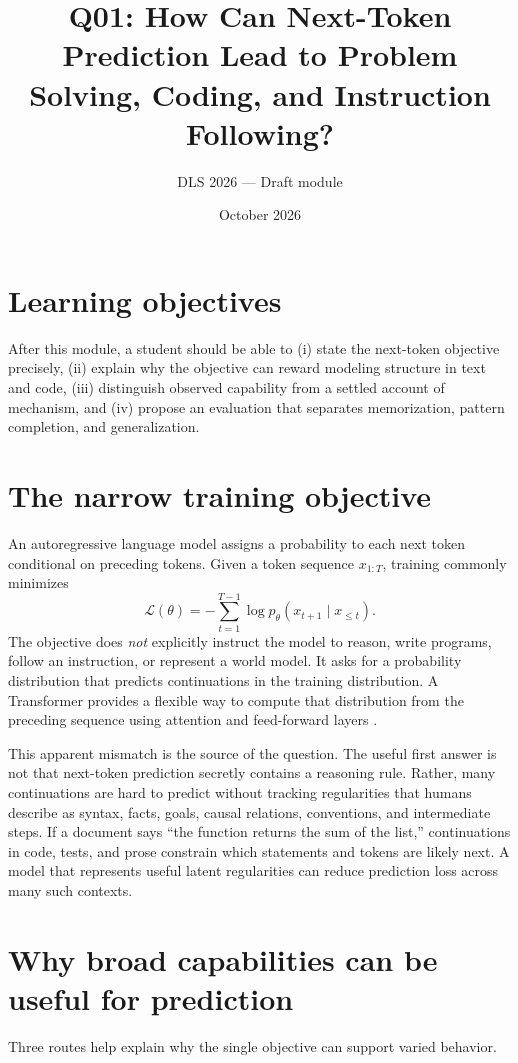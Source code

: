 \documentclass[11pt]{article}
\title{Q01: How Can Next-Token Prediction Lead to Problem Solving, Coding, and Instruction Following?}
\author{DLS 2026 --- Draft module}
\date{October 2026}
\begin{document}
\maketitle

\section*{Learning objectives}
After this module, a student should be able to (i) state the next-token objective precisely, (ii) explain why the objective can reward modeling structure in text and code, (iii) distinguish observed capability from a settled account of mechanism, and (iv) propose an evaluation that separates memorization, pattern completion, and generalization.

\section{The narrow training objective}
An autoregressive language model assigns a probability to each next token conditional on preceding tokens.  Given a token sequence $x_{1:T}$, training commonly minimizes
\[
  \mathcal{L}(\theta)=-\sum_{t=1}^{T-1}\log p_\theta(x_{t+1}\mid x_{\leq t}).
\]
The objective does \emph{not} explicitly instruct the model to reason, write programs, follow an instruction, or represent a world model. It asks for a probability distribution that predicts continuations in the training distribution. A Transformer provides a flexible way to compute that distribution from the preceding sequence using attention and feed-forward layers \cite{vaswani2017attention}.

This apparent mismatch is the source of the question. The useful first answer is not that next-token prediction secretly contains a reasoning rule. Rather, many continuations are hard to predict without tracking regularities that humans describe as syntax, facts, goals, causal relations, conventions, and intermediate steps. If a document says ``the function returns the sum of the list,'' continuations in code, tests, and prose constrain which statements and tokens are likely next. A model that represents useful latent regularities can reduce prediction loss across many such contexts.

\section{Why broad capabilities can be useful for prediction}
Three routes help explain why the single objective can support varied behavior.
\end{document}
